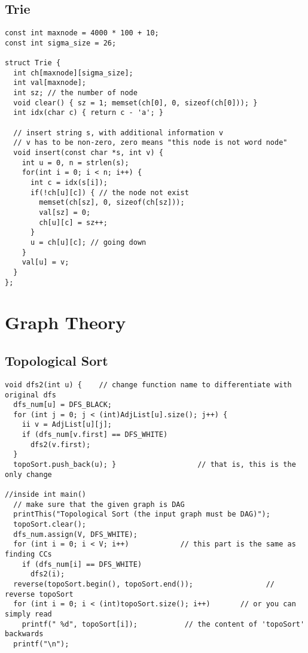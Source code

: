 \documentclass[letterpaper]{article}
\begin{document}
\subsection{Trie}
\begin{lstlisting}
const int maxnode = 4000 * 100 + 10;
const int sigma_size = 26;

struct Trie {
  int ch[maxnode][sigma_size];
  int val[maxnode];
  int sz; // the number of node
  void clear() { sz = 1; memset(ch[0], 0, sizeof(ch[0])); }
  int idx(char c) { return c - 'a'; }

  // insert string s, with additional information v
  // v has to be non-zero, zero means "this node is not word node" 
  void insert(const char *s, int v) {
    int u = 0, n = strlen(s);
    for(int i = 0; i < n; i++) {
      int c = idx(s[i]);
      if(!ch[u][c]) { // the node not exist
        memset(ch[sz], 0, sizeof(ch[sz]));
        val[sz] = 0;
        ch[u][c] = sz++;
      }
      u = ch[u][c]; // going down
    }
    val[u] = v;
  }
};
\end{lstlisting}

\section{Graph Theory}
\subsection{Topological Sort}
\begin{lstlisting}
void dfs2(int u) {    // change function name to differentiate with original dfs
  dfs_num[u] = DFS_BLACK;
  for (int j = 0; j < (int)AdjList[u].size(); j++) {
    ii v = AdjList[u][j];
    if (dfs_num[v.first] == DFS_WHITE)
      dfs2(v.first);
  }
  topoSort.push_back(u); }                   // that is, this is the only change

//inside int main()
  // make sure that the given graph is DAG
  printThis("Topological Sort (the input graph must be DAG)");
  topoSort.clear();
  dfs_num.assign(V, DFS_WHITE);
  for (int i = 0; i < V; i++)            // this part is the same as finding CCs
    if (dfs_num[i] == DFS_WHITE)
      dfs2(i);
  reverse(topoSort.begin(), topoSort.end());                 // reverse topoSort
  for (int i = 0; i < (int)topoSort.size(); i++)       // or you can simply read
    printf(" %d", topoSort[i]);           // the content of 'topoSort' backwards
  printf("\n");
\end{lstlisting}
\end{document}
